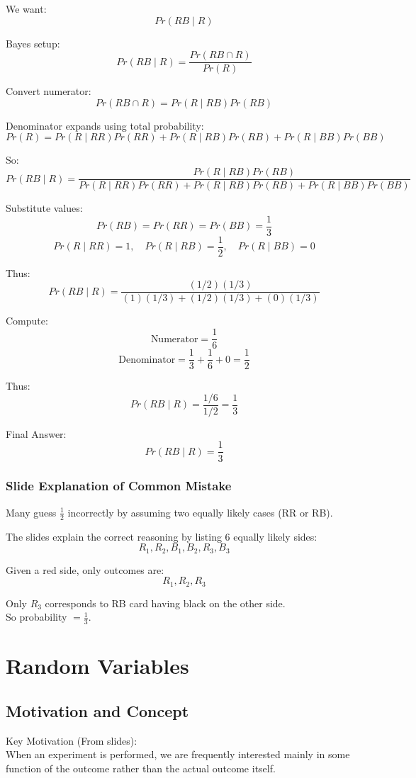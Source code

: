 \documentclass{article}
\begin{document}
We want:
\[
Pr(RB\mid R)
\]

Bayes setup:
\[
Pr(RB\mid R)=\frac{Pr(RB\cap R)}{Pr(R)}
\]

Convert numerator:
\[
Pr(RB\cap R)=Pr(R\mid RB)Pr(RB)
\]

Denominator expands using total probability:
\[
Pr(R)=Pr(R\mid RR)Pr(RR)+Pr(R\mid RB)Pr(RB)+Pr(R\mid BB)Pr(BB)
\]

So:
\[
Pr(RB\mid R)=
\frac{Pr(R\mid RB)Pr(RB)}
{Pr(R\mid RR)Pr(RR)+Pr(R\mid RB)Pr(RB)+Pr(R\mid BB)Pr(BB)}
\]

Substitute values:
\[
Pr(RB)=Pr(RR)=Pr(BB)=\frac{1}{3}
\]
\[
Pr(R\mid RR)=1,\quad Pr(R\mid RB)=\frac{1}{2},\quad Pr(R\mid BB)=0
\]

Thus:
\[
Pr(RB\mid R)=
\frac{(1/2)(1/3)}
{(1)(1/3)+(1/2)(1/3)+(0)(1/3)}
\]

Compute:
\[
\text{Numerator}=\frac{1}{6}
\]
\[
\text{Denominator}=\frac{1}{3}+\frac{1}{6}+0=\frac{1}{2}
\]

Thus:
\[
Pr(RB\mid R)=\frac{1/6}{1/2}=\frac{1}{3}
\]

Final Answer:
\[
Pr(RB\mid R)=\frac{1}{3}
\]

\subsubsection*{Slide Explanation of Common Mistake}
Many guess $\frac{1}{2}$ incorrectly by assuming two equally likely cases (RR or RB).

The slides explain the correct reasoning by listing 6 equally likely sides:
\[
R_1,R_2,B_1,B_2,R_3,B_3
\]

Given a red side, only outcomes are:
\[
R_1,R_2,R_3
\]

Only $R_3$ corresponds to RB card having black on the other side.\\
So probability $=\frac{1}{3}$.

\section{Random Variables}

\subsection{Motivation and Concept}

Key Motivation (From slides):\\
When an experiment is performed, we are frequently interested mainly in some function of the outcome rather than the actual outcome itself.
\end{document}
